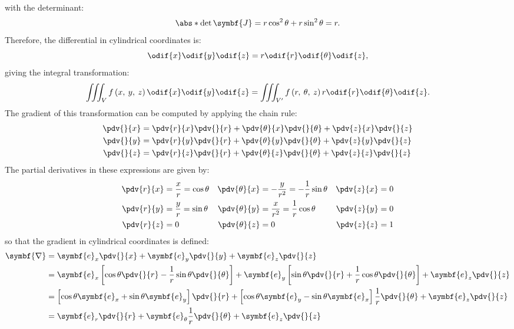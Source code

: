 \documentclass{article}
\begin{document}
with the determinant:
\begin{equation*}
    \abs*{\det{\symbf{J}}} = r \cos^2{\theta} + r \sin^2{\theta} = r.
\end{equation*}
Therefore, the differential in cylindrical coordinates is:
\begin{equation*}
    \odif{x} \odif{y} \odif{z} = r \odif{r} \odif{\theta} \odif{z},
\end{equation*}
giving the integral transformation:
\begin{equation*}
    \iiint_{V} f\left( x, \: y, \: z \right) \odif{x} \odif{y} \odif{z} = \iiint_{V'} f\left( r, \: \theta, \: z \right) r \odif{r} \odif{\theta} \odif{z}.
\end{equation*}
The gradient of this transformation can be computed by applying the
chain rule:
\begin{align*}
    \pdv{}{x} & = \pdv{r}{x} \pdv{}{r} + \pdv{\theta}{x} \pdv{}{\theta} + \pdv{z}{x} \pdv{}{z} \\
    \pdv{}{y} & = \pdv{r}{y} \pdv{}{r} + \pdv{\theta}{y} \pdv{}{\theta} + \pdv{z}{y} \pdv{}{z} \\
    \pdv{}{z} & = \pdv{r}{z} \pdv{}{r} + \pdv{\theta}{z} \pdv{}{\theta} + \pdv{z}{z} \pdv{}{z}
\end{align*}
The partial derivatives in these expressions are given by:
\begin{align*}
    \pdv{r}{x} & = \frac{x}{r} = \cos{\theta} & \pdv{\theta}{x} & = -\frac{y}{r^2} = -\frac{1}{r}\sin{\theta} & \pdv{z}{x} & = 0 \\
    \pdv{r}{y} & = \frac{y}{r} = \sin{\theta} & \pdv{\theta}{y} & = \frac{x}{r^2} = \frac{1}{r}\cos{\theta}   & \pdv{z}{y} & = 0 \\
    \pdv{r}{z} & = 0                          & \pdv{\theta}{z} & = 0                                         & \pdv{z}{z} & = 1
\end{align*}
so that the gradient in cylindrical coordinates is defined:
\begin{align*}
    \symbf{\nabla} & = \symbf{e}_x \pdv{}{x} + \symbf{e}_y \pdv{}{y} + \symbf{e}_z \pdv{}{z}                                                                                                                                             \\
                   & = \symbf{e}_x \left[ \cos{\theta} \pdv{}{r} - \frac{1}{r} \sin{\theta} \pdv{}{\theta} \right] + \symbf{e}_y \left[ \sin{\theta} \pdv{}{r} + \frac{1}{r} \cos{\theta} \pdv{}{\theta} \right] + \symbf{e}_z \pdv{}{z} \\
                   & = \left[ \cos{\theta} \symbf{e}_x + \sin{\theta} \symbf{e}_y \right] \pdv{}{r} + \left[ \cos{\theta} \symbf{e}_y - \sin{\theta} \symbf{e}_x \right] \frac{1}{r} \pdv{}{\theta} + \symbf{e}_z \pdv{}{z}              \\
                   & = \symbf{e}_r \pdv{}{r} + \symbf{e}_\theta \frac{1}{r} \pdv{}{\theta} + \symbf{e}_z \pdv{}{z}
\end{align*}
\end{document}

